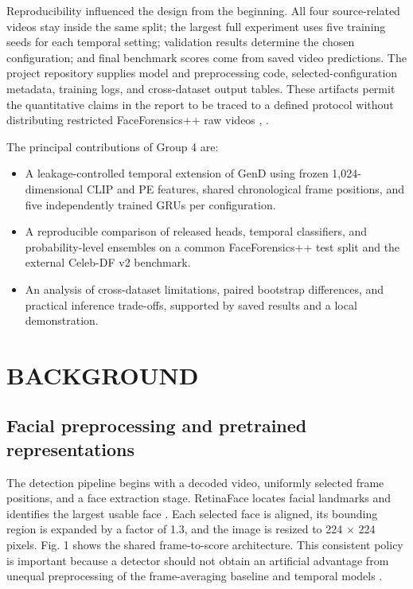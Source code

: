 \documentclass[conference,10pt]{IEEEtran}
\begin{document}
Reproducibility influenced the design from the beginning. All four source-related videos stay inside the same split; the largest full experiment uses five training seeds for each temporal setting; validation results determine the chosen configuration; and final benchmark scores come from saved video predictions. The project repository supplies model and preprocessing code, selected-configuration metadata, training logs, and cross-dataset output tables. These artifacts permit the quantitative claims in the report to be traced to a defined protocol without distributing restricted FaceForensics++ raw videos \cite{rossler2019}, \cite{capstone2026}.

The principal contributions of Group 4 are:

\begin{itemize}
\item A leakage-controlled temporal extension of GenD using frozen 1,024-dimensional CLIP and PE features, shared chronological frame positions, and five independently trained GRUs per configuration.
\item A reproducible comparison of released heads, temporal classifiers, and probability-level ensembles on a common FaceForensics++ test split and the external Celeb-DF v2 benchmark.
\item An analysis of cross-dataset limitations, paired bootstrap differences, and practical inference trade-offs, supported by saved results and a local demonstration.
\end{itemize}
\FloatBarrier
\clearpage
\section{BACKGROUND}
\subsection{Facial preprocessing and pretrained representations}
The detection pipeline begins with a decoded video, uniformly selected frame positions, and a face extraction stage. RetinaFace locates facial landmarks and identifies the largest usable face \cite{deng2020}. Each selected face is aligned, its bounding region is expanded by a factor of 1.3, and the image is resized to 224 × 224 pixels. Fig. 1 shows the shared frame-to-score architecture. This consistent policy is important because a detector should not obtain an artificial advantage from unequal preprocessing of the frame-averaging baseline and temporal models \cite{capstone2026}.
\end{document}
